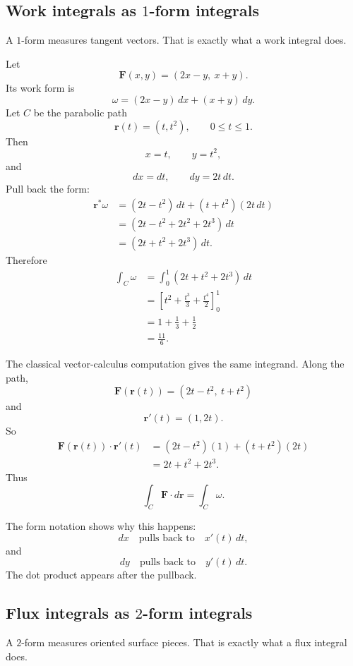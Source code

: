 \subsection{Work integrals as \texorpdfstring{\(1\)}{1}-form integrals}

A \(1\)-form measures tangent vectors.  That is exactly what a work integral does.

Let
\[
    \mathbf F(x,y)=(2x-y,\ x+y).
\]
Its work form is
\[
    \omega=(2x-y)\,dx+(x+y)\,dy.
\]
Let \(C\) be the parabolic path
\[
    \mathbf r(t)=(t,t^2),
    \qquad
    0\le t\le1.
\]
Then
\[
    x=t,\qquad y=t^2,
\]
and
\[
    dx=dt,\qquad dy=2t\,dt.
\]
Pull back the form:
\[
\begin{aligned}
    \mathbf r^*\omega
    &=
    (2t-t^2)\,dt+(t+t^2)(2t\,dt)\\
    &=
    (2t-t^2+2t^2+2t^3)\,dt\\
    &=
    (2t+t^2+2t^3)\,dt.
\end{aligned}
\]
Therefore
\[
\begin{aligned}
    \int_C \omega
    &=
    \int_0^1 (2t+t^2+2t^3)\,dt\\
    &=
    \left[t^2+\frac{t^3}{3}+\frac{t^4}{2}\right]_0^1\\
    &=
    1+\frac13+\frac12\\
    &=
    \frac{11}{6}.
\end{aligned}
\]

The classical vector-calculus computation gives the same integrand.  Along the path,
\[
    \mathbf F(\mathbf r(t))=(2t-t^2,\ t+t^2)
\]
and
\[
    \mathbf r'(t)=(1,2t).
\]
So
\[
\begin{aligned}
    \mathbf F(\mathbf r(t))\cdot\mathbf r'(t)
    &=
    (2t-t^2)(1)+(t+t^2)(2t)\\
    &=
    2t+t^2+2t^3.
\end{aligned}
\]
Thus
\[
    \int_C \mathbf F\cdot d\mathbf r
    =
    \int_C\omega.
\]

The form notation shows why this happens:
\[
    dx
    \quad\text{pulls back to}\quad
    x'(t)\,dt,
\]
and
\[
    dy
    \quad\text{pulls back to}\quad
    y'(t)\,dt.
\]
The dot product appears after the pullback.

\subsection{Flux integrals as \texorpdfstring{\(2\)}{2}-form integrals}

A \(2\)-form measures oriented surface pieces.  That is exactly what a flux integral
does.

